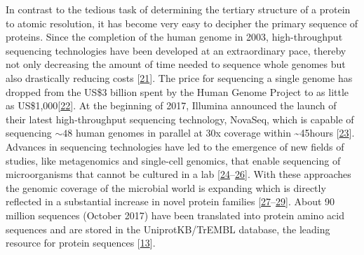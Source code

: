 \documentclass[11pt,a4paper,twoside]{book}
\theoremstyle{definition}
\theoremstyle{definition}
\theoremstyle{remark}
\begin{document}
In contrast to the tedious task of determining the tertiary structure of
a protein to atomic resolution, it has become very easy to decipher the
primary sequence of proteins. Since the completion of the human genome
in 2003, high-throughput sequencing technologies have been developed at
an extraordinary pace, thereby not only decreasing the amount of time
needed to sequence whole genomes but also drastically reducing costs
{[}\protect\hyperlink{ref-Reuter2015}{21}{]}. The price for sequencing a
single genome has dropped from the US\$3 billion spent by the Human
Genome Project to as little as
US\$1,000{[}\protect\hyperlink{ref-Goodwin2016}{22}{]}. At the beginning
of 2017, Illumina announced the launch of their latest high-throughput
sequencing technology, NovaSeq, which is capable of sequencing
\(\sim \! 48\) human genomes in parallel at 30x coverage within
\textasciitilde{}45hours
{[}\protect\hyperlink{ref-NovaSeqSystemSpecifications}{23}{]}. Advances
in sequencing technologies have led to the emergence of new fields of
studies, like metagenomics and single-cell genomics, that enable
sequencing of microorganisms that cannot be cultured in a lab
{[}\protect\hyperlink{ref-Tringe2005}{24}--\protect\hyperlink{ref-Wooley2010}{26}{]}.
With these approaches the genomic coverage of the microbial world is
expanding which is directly reflected in a substantial increase in novel
protein families
{[}\protect\hyperlink{ref-Rinke2013}{27}--\protect\hyperlink{ref-Forster2017}{29}{]}.
About 90 million sequences (October 2017) have been translated into
protein amino acid sequences and are stored in the UniprotKB/TrEMBL
database, the leading resource for protein sequences
{[}\protect\hyperlink{ref-TheUniProtConsortium2017}{13}{]}.
\end{document}
